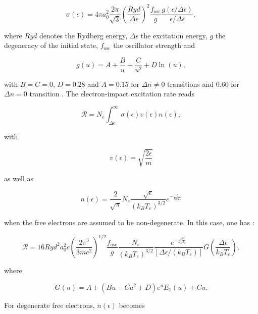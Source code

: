 \documentclass[a4paper,10pt]{article}
\begin{document}
\begin{equation}
\sigma(\epsilon)=4\pi a_0^2\frac{2\pi}{\sqrt{3}}\left(\frac{Ryd}{\Delta\epsilon}\right)^2\frac{f_{\mathrm{osc}}}{g}\frac{g(\epsilon/\Delta\epsilon)}{\epsilon/\Delta\epsilon},
\end{equation}

\noindent where $Ryd$ denotes the Rydberg energy, $\Delta\epsilon$ the excitation energy, $g$ the degeneracy of the initial state, $f_{\mathrm{osc}}$ the oscillator strength and

\begin{equation}
g(u)=A+\frac{B}{u}+\frac{C}{u^2}+D \ln(u),
\end{equation}

\noindent with $B=C=0$, $D=0.28$ and $A=0.15$ for $\Delta n\ne 0$ transitions and $0.60$ for $\Delta n=0$ transition \cite{mewe72,faussurier09}. The electron-impact excitation rate reads

\begin{equation}
\mathcal{R}=N_e\int_{\Delta\epsilon}^{\infty}\sigma(\epsilon)v(\epsilon)n(\epsilon),
\end{equation}

\noindent with

\begin{equation}
v(\epsilon)=\sqrt{\frac{2\epsilon}{m}}
\end{equation}

\noindent as well as

\begin{equation}
n(\epsilon)=\frac{2}{\sqrt{\pi}}N_e\frac{\sqrt{\epsilon}}{\left(k_BT_e\right)^{3/2}}e^{-\frac{\epsilon}{k_BT_e}}
\end{equation}

\noindent when the free electrons are assumed to be non-degenerate. In this case, one has \cite{faussurier09}:

\begin{equation}
\mathcal{R}=16 Ryd^2a_0^2c\left(\frac{2\pi^3}{3mc^2}\right)^{1/2}\frac{f_{\mathrm{osc}}}{g}\frac{N_e}{(k_BT_e)^{3/2}}\frac{e^{-\frac{\Delta\epsilon}{k_BT_e}}}{\left[\Delta\epsilon/(k_BT_e)\right]}G\left(\frac{\Delta\epsilon}{k_BT_e}\right),
\end{equation}

\noindent where

\begin{equation}
G(u)=A+(Bu-Cu^2+D)e^uE_1(u)+Cu.
\end{equation}

\noindent For degenerate free electrons, $n(\epsilon)$ becomes
\end{document}
